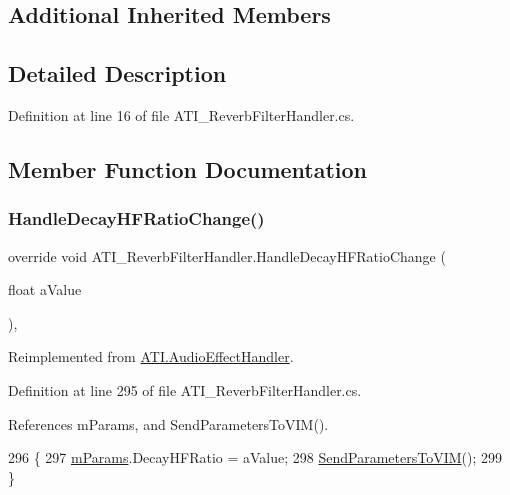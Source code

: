 \subsection*{Additional Inherited Members}


\subsection{Detailed Description}


Definition at line 16 of file A\+T\+I\+\_\+\+Reverb\+Filter\+Handler.\+cs.



\subsection{Member Function Documentation}
\mbox{\label{class_a_t_i___reverb_filter_handler_a68dab792c963c33be3618c9595a6a734}} 
\subsubsection{\texorpdfstring{Handle\+Decay\+H\+F\+Ratio\+Change()}{HandleDecayHFRatioChange()}}
{\footnotesize\ttfamily override void A\+T\+I\+\_\+\+Reverb\+Filter\+Handler.\+Handle\+Decay\+H\+F\+Ratio\+Change (\begin{DoxyParamCaption}\item[{float}]{a\+Value }\end{DoxyParamCaption})\hspace{0.3cm}{\ttfamily [protected]}, {\ttfamily [virtual]}}



Reimplemented from \hyperlink{class_a_t_i_1_1_audio_effect_handler_af00cbc35b44d68de0d2d0497e1defa3a}{A\+T\+I.\+Audio\+Effect\+Handler}.



Definition at line 295 of file A\+T\+I\+\_\+\+Reverb\+Filter\+Handler.\+cs.



References m\+Params, and Send\+Parameters\+To\+V\+I\+M().


\begin{DoxyCode}
296     \{
297         \hyperlink{class_a_t_i___reverb_filter_handler_a034260fbce2052b42bceddc891632347}{mParams}.DecayHFRatio = aValue;
298         \hyperlink{class_a_t_i___reverb_filter_handler_aacb469dc3038fca616d638f6a5a04a30}{SendParametersToVIM}();
299     \}
\end{DoxyCode}
\mbox{\label{class_a_t_i___reverb_filter_handler_a30a45fb9d8bbd7e10054eaa4595666b3}} 
